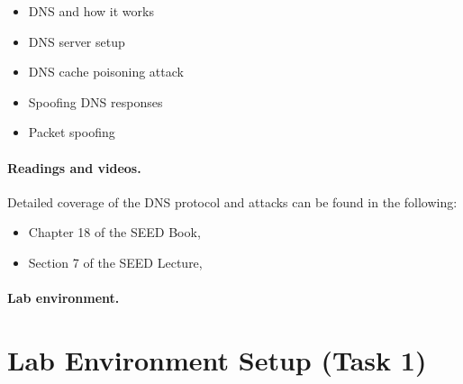 \begin{itemize}[noitemsep]
\item DNS and how it works
\item DNS server setup
\item DNS cache poisoning attack
\item Spoofing DNS responses
\item Packet spoofing
\end{itemize}


\paragraph{Readings and videos.}
Detailed coverage of the DNS protocol and attacks can be found in the following:

\begin{itemize}
\item Chapter 18 of the SEED Book, \seedbook
\item Section 7 of the SEED Lecture, \seedisvideo
\end{itemize}


\paragraph{Lab environment.} \seedenvironmentB


\begin{comment}
\vspace{0.2in}
\noindent
\fbox{\parbox{\textwidth}{
\noindent
\textbf{Customization.}
In this lab description, we use the domain \texttt{attacker32.com} to refer to the
domain controlled by the attacker. When students do this lab, they are not allowed
to use this name; instead, they should use a domain name that includes their last names.
The objective of this requirement is to differentiate student's work. Since 
the domain name is only visible inside the lab environment, not to the
public, any name, including those already owned by others, can be used
safely in this lab. 
}}
\end{comment}




\section{Lab Environment Setup (Task 1)}
\label{sec:environment}


